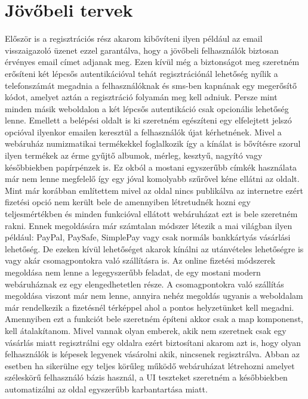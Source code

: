 \section{Jövőbeli tervek}
Először is a regisztrációs rész akarom kibővíteni ilyen például az email visszaigazoló üzenet ezzel garantálva, hogy a jövőbeli felhasználók biztosan érvényes email címet adjanak meg. Ezen kívül még a biztonságot meg szeretném erősíteni két lépcsős autentikációval tehát regisztrációnál lehetőség nyílik a telefonszámát megadnia a felhasználóknak és sms-ben kapnának egy megerősítő kódot, amelyet aztán a regisztráció folyamán meg kell adniuk. Persze mint minden másik weboldalon a két lépcsős autentikáció csak opcionális lehetőség lenne. Emellett a belépési oldalt is ki szeretném egészíteni egy elfelejtett jelszó opcióval ilyenkor emailen keresztül a felhasználók újat kérhetnének. Mivel a webáruház numizmatikai termékekkel foglalkozik így a kínálat is bővítésre szorul ilyen termékek az érme gyűjtő albumok, mérleg, kesztyű, nagyító vagy későbbiekben papírpénzek is. Ez okból a mostani egyszerűbb címkék használata már nem lenne megfelelő így egy jóval komolyabb szűrővel kéne ellátni az oldalt. Mint már korábban említettem mivel az oldal nincs publikálva az internetre ezért fizetési opció nem került bele de amennyiben létretudnék hozni egy teljesmértékben és minden funkcióval ellátott webáruházat ezt is bele szeretném rakni. Ennek megoldására már számtalan módszer létezik a mai világban ilyen például: PayPal, PaySafe, SimplePay vagy csak normáls bankkártyás vásárlási lehetőség. De ezeken kívül lehetőséget akarok kínálni az utánvételes lehetőségre is vagy akár csomagpontokra való szállításra is. Az online fizetési módszerek megoldása nem lenne a legegyszerűbb feladat, de egy mostani modern webáruháznak ez egy elengedhetetlen része. A csomagpontokra való szállítás megoldása viszont már nem lenne, annyira nehéz megoldás ugyanis a weboldalam már rendelkezik a fizetésnél térképpel ahol a pontos helyzetünket kell megadni. Amennyiben ezt a funkciót bele szeretném építeni akkor csak a map komponenst, kell átalakítanom. Mivel vannak olyan emberek, akik nem szeretnek csak egy vásárlás miatt regisztrálni egy oldalra ezért biztosítani akarom azt is, hogy olyan felhasználók is képesek legyenek vásárolni akik, nincsenek regisztrálva. Abban az esetben ha sikerülne egy teljes körűleg működő webáruházat létrehozni amelyet széleskörű felhasználó bázis használ, a UI teszteket szeretném a későbbiekben automatizálni az oldal egyszerűbb karbantartása miatt.